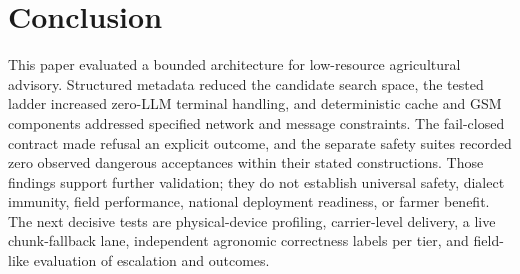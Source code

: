 \documentclass[11pt,a4paper]{article}
\begin{document}
\section{Conclusion}
\label{sec:conclusion}

This paper evaluated a bounded architecture for low-resource agricultural advisory. Structured metadata reduced the candidate search space, the tested ladder increased zero-LLM terminal handling, and deterministic cache and GSM components addressed specified network and message constraints. The fail-closed contract made refusal an explicit outcome, and the separate safety suites recorded zero observed dangerous acceptances within their stated constructions. Those findings support further validation; they do not establish universal safety, dialect immunity, field performance, national deployment readiness, or farmer benefit. The next decisive tests are physical-device profiling, carrier-level delivery, a live chunk-fallback lane, independent agronomic correctness labels per tier, and field-like evaluation of escalation and outcomes.



\end{document}
